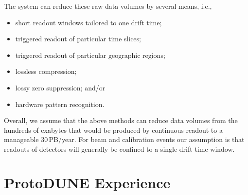 \documentclass[../main-v1.tex]{subfiles}
\begin{document}
The  system can reduce these raw data volumes by several means, i.e.,
\begin{itemize} 
\item short readout windows tailored to one drift time;
\item triggered readout of particular time slices;
\item triggered readout of particular geographic regions;
\item lossless compression; %
\item lossy zero suppression; and/or
\item hardware pattern recognition.
\end{itemize}


Overall, we assume that the above methods can reduce data volumes from the hundreds of exabytes that would be produced by continuous readout to a manageable 30\,PB/year. For beam and calibration events our assumption is that readouts of  detectors will  generally be confined to a single drift time window.




\section{ProtoDUNE Experience}
\label{sec:est:ProtoDUNE}  
\end{document}
